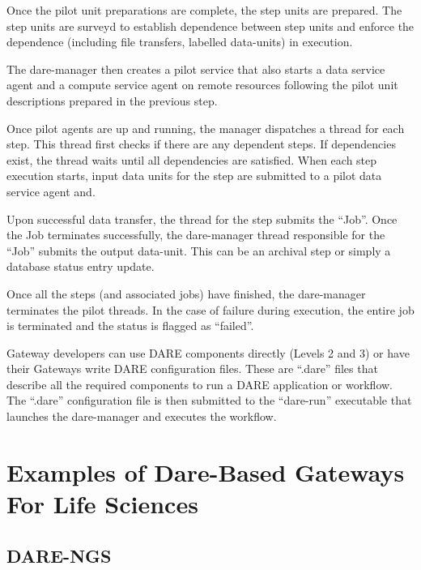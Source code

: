 \documentclass[]{svjour3}
\begin{document}
Once the pilot unit preparations are complete, the step units are prepared. The
step units are surveyd to establish dependence between step units and enforce
the dependence (including file transfers, labelled data-units) in execution. 

The dare-manager then creates a pilot service that also starts a data
service agent and a compute service agent on remote resources following the
pilot unit descriptions prepared in the previous step.

Once pilot agents are up and running, the manager dispatches a thread for each
step. This thread first checks if there are any dependent steps. If dependencies exist,
the thread waits until all dependencies are satisfied. When each step execution starts,
input data units for the step are submitted to a pilot data service agent and.

Upon successful data transfer, the thread for the step submits the
``Job''. Once the Job terminates successfully, the dare-manager thread responsible
for the ``Job'' submits the output data-unit. This can be an archival step or simply
a database status entry update.

Once all the steps (and associated jobs) have finished, the dare-manager terminates
the pilot threads. In the case of failure during execution, the entire job is terminated
and the status is flagged as ``failed''.

Gateway developers can use DARE components directly (Levels 2 and 3) or have their
Gateways write DARE configuration files. These are ``.dare'' files that describe
all the required components to run a DARE application or workflow. The ``.dare''
configuration file is then submitted to the ``dare-run'' executable that launches
the dare-manager and executes the workflow.


\section{Examples of Dare-Based Gateways For Life Sciences}


\subsection{DARE-NGS}
\end{document}
